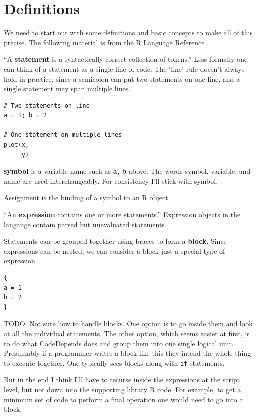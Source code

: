 \documentclass[12pt]{article}
\begin{document}
\section{Definitions}

We need to start out with some definitions and basic concepts to make all
of this precise. The following material is from the R
Language Reference \cite{Rlang}.

``A \textbf{statement} is a
syntactically correct collection of tokens.'' Less formally one can think of
a statement as a single line of code. The `line' rule doesn't always hold in practice,
since a semicolon can put two statements on one line, and a single
statement may span multiple lines.

\begin{verbatim}
# Two statements on line
a = 1; b = 2

# One statement on multiple lines
plot(x,
     y)
\end{verbatim}

\textbf{symbol} is a variable name such as \textbf{a, b} above.  The words
symbol, variable, and name are used interchangeably. For consistency I'll
stick with symbol.

Assignment is the binding of a symbol to an R object.

``An \textbf{expression} contains one or more statements.'' Expression objects
in the langauge contain parsed but unevaluated statements. 

Statements can be grouped together using braces to form a \textbf{block}.
Since expressions can be nested, we can consider a block just a special
type of expression.

\begin{verbatim}
{
a = 1
b = 2
}
\end{verbatim}

TODO: Not sure how to handle blocks. One option is to go inside them and
look at all the individual statements. The other option, which seems easier
at first, is to do what CodeDepends does and group them into one
single logical unit. Presumably if a programmer writes a block like this
they intend the whole thing to execute together. One typically sees blocks
along with \texttt{if} statements.

But in the end I think I'll have to recurse inside the expressions at the
script level, but not down into the supporting library R code. For example, to
get a minimum set of code to perform a final operation one would need to go
into a block.
\end{document}
